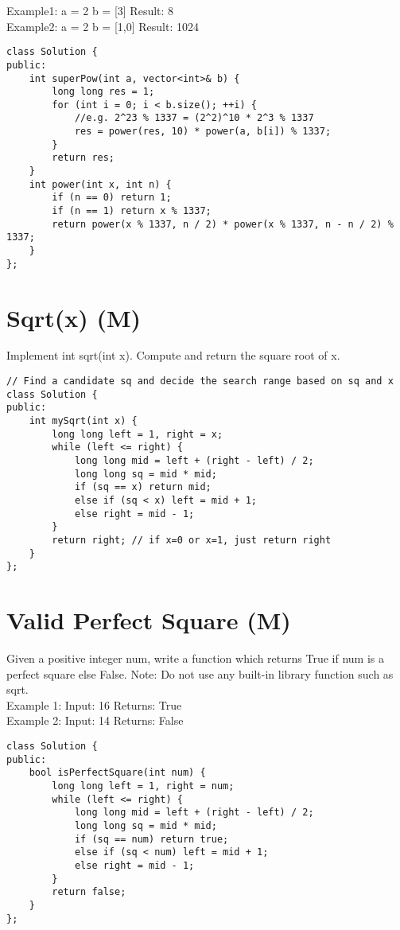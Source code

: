 Example1:
a = 2
b = [3]
Result: 8\\

Example2:
a = 2
b = [1,0]
Result: 1024\\

\begin{lstlisting}
class Solution {
public:
    int superPow(int a, vector<int>& b) {
        long long res = 1;
        for (int i = 0; i < b.size(); ++i) {
            //e.g. 2^23 % 1337 = (2^2)^10 * 2^3 % 1337
            res = power(res, 10) * power(a, b[i]) % 1337;
        }
        return res;
    }
    int power(int x, int n) {
        if (n == 0) return 1;
        if (n == 1) return x % 1337;
        return power(x % 1337, n / 2) * power(x % 1337, n - n / 2) % 1337;
    }
};
\end{lstlisting}


\section{Sqrt(x) (M)}
Implement int sqrt(int x). Compute and return the square root of x. \\

\begin{lstlisting}
// Find a candidate sq and decide the search range based on sq and x
class Solution {
public:
    int mySqrt(int x) {
        long long left = 1, right = x;
        while (left <= right) {
            long long mid = left + (right - left) / 2;
            long long sq = mid * mid; 
            if (sq == x) return mid;
            else if (sq < x) left = mid + 1;
            else right = mid - 1;
        }
        return right; // if x=0 or x=1, just return right
    }
};
\end{lstlisting}


\section{Valid Perfect Square (M)}
Given a positive integer num, write a function which returns True if num is a perfect square else False. Note: Do not use any built-in library function such as sqrt.\\

Example 1:
Input: 16
Returns: True\\

Example 2:
Input: 14
Returns: False\\

\begin{lstlisting}
class Solution {
public:
    bool isPerfectSquare(int num) {
        long long left = 1, right = num;
        while (left <= right) {
            long long mid = left + (right - left) / 2;
            long long sq = mid * mid; 
            if (sq == num) return true;
            else if (sq < num) left = mid + 1;
            else right = mid - 1;
        }
        return false;     
    }
};
\end{lstlisting}


